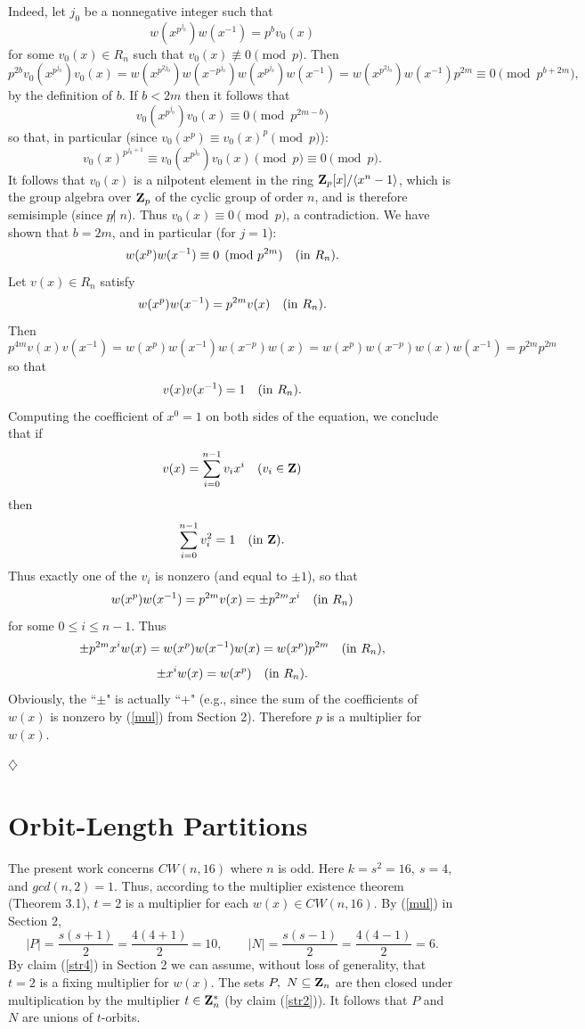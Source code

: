 {\begin{pr}
{  Indeed, let $j_0$ be a nonnegative integer such that 
	$$ w(x^{p^{j_0}})w(x^{-1})=p^b v_0(x)$$ 
  for some $v_0(x) \in R_n$ such that $v_0(x) \not\equiv 0 \pmod{p}$. 
  Then 
   $$ p^{2b} v_0(x^{p^{j_0}}) v_0(x)=
       w(x^{p^{2j_0}}) w(x^{-p^{j_0}}) w(x^{p^{j_0}}) w(x^{-1})=
       w(x^{p^{2j_0}}) w(x^{-1}) p^{2m} \equiv 0 \pmod{p^{b+2m}},$$
  by the definition of $b$. If $b<2m$ then it follows that 
	$$v_0(x^{p^{j_0}}) v_0(x) \equiv 0 \pmod{p^{2m-b}} $$ 
  so that, in particular (since $v_0(x^p) \equiv v_0(x)^p \pmod {p}$): 
	$$v_0(x)^{p^{{j_0}+1}} \equiv v_0(x^{p^{j_0}}) v_0(x) \pmod{p} \equiv 0 \pmod{p}. $$          
  It follows that $v_0(x)$ is a nilpotent element in the ring  
  ${\bf Z}_p [x] / \langle x^n-1 \rangle$, which is the group algebra over  
  ${\bf Z}_p$ of the cyclic group of order $n$, and is therefore semisimple 
  (since $p \not| \; n$). Thus $v_0(x) \equiv 0 \pmod{p}$, a contradiction. 
  We have shown that $b=2m$, and in particular (for $j=1$): 
	 $$ w(x^p)w(x^{-1}) \equiv 0 \pmod {p^{2m}}  \quad ({\rm in} \ R_n).$$  
  Let $v(x) \in R_n$ satisfy 
	 $$ w(x^p)w(x^{-1})=p^{2m}v(x)  \quad ({\rm in} \ R_n).$$ 
  Then 
   $$ p^{4m} v(x) v(x^{-1})=
       w(x^{p}) w(x^{-1}) w(x^{-p}) w(x)= 
       w(x^{p}) w(x^{-p}) w(x) w(x^{-1})=p^{2m}p^{2m}$$  
  so that 
	$$ v(x)v(x^{-1})=1  \quad ({\rm in} \ R_n).$$ 
  Computing the coefficient of $x^0=1$ on both sides of the equation, we 
  conclude that if 
	$$v(x)=\sum_{i=0}^{n-1}v_i x^i  \quad (v_i \in {\bf Z})$$
  then 
	$$\sum_{i=0}^{n-1}v_i^2 =1 \quad ({\rm in} \ {\bf Z}). $$ 
  Thus exactly one of the $v_i$ is nonzero (and equal to $\pm 1$), so that 
       $$ w(x^p)w(x^{-1})=p^{2m}v(x)=\pm p^{2m} x^i  \quad ({\rm in} \ R_n)$$  
  for some $0 \leq i \leq n-1$. Thus
     $$\pm p^{2m} x^i w(x)= w(x^p)w(x^{-1})w(x)= w(x^p) p^{2m} \quad ({\rm in} \ R_n),$$ 
     $$\pm x^i w(x)= w(x^p) \quad ({\rm in} \ R_n).$$ 
  Obviously, the ``$\pm$" is actually ``$+$" (e.g., since the sum of the 
  coefficients of $w(x)$ is nonzero by (\ref{mul}) from Section 2). Therefore $p$ 
  is a multiplier for $w(x)$. 
			\begin{flushright}
				$\diamondsuit$
			\end{flushright}
}
\end{pr}


\section{ Orbit-Length Partitions } \label{sec2}

The present work concerns $ CW(n,16)$ where $n$ is odd.
Here $k=s^{2}=16, \ s=4$, and $gcd(n,2)=1$. 
Thus, according to the multiplier existence theorem (Theorem 3.1), 
$t=2$ is a multiplier for each $w(x) \in CW(n,16)$.  
By (\ref{mul}) in Section 2, 
$$ |P|=\frac{s(s+1)}{2}=\frac{4(4+1)}{2}=10, \qquad  
|N|=\frac{s(s-1)}{2}=\frac{4(4-1)}{2}=6.$$ 
By claim (\ref{str4}) in Section 2 we can assume, without  
loss of generality, that $t=2$ is a fixing multiplier for $w(x)$.  
The sets $P, \ N \subseteq {\bf Z}_{n}$ are then closed
under multiplication by the multiplier $t \in  {\bf Z}^{*}_{n} $ (by 
claim (\ref{str2})). It follows that $P$ and $N$ are unions of $t$-orbits.  

}
